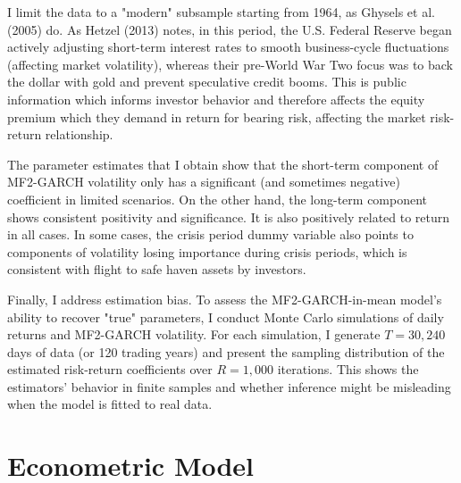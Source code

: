 \documentclass[12pt]{article}
\begin{document}
I limit the data to a "modern" subsample starting from 1964, as Ghysels et al. (2005) do. As Hetzel (2013) notes, in this period, the U.S. Federal Reserve began actively adjusting short-term interest rates to smooth business-cycle fluctuations (affecting market volatility), whereas their pre-World War Two focus was to back the dollar with gold and prevent speculative credit booms. This is public information which informs investor behavior and therefore affects the equity premium which they demand in return for bearing risk, affecting the market risk-return relationship.\par
The parameter estimates that I obtain show that the short-term component of MF2-GARCH volatility only has a significant (and sometimes negative) coefficient in limited scenarios. On the other hand, the long-term component shows consistent positivity and significance. It is also positively related to return in all cases. In some cases, the crisis period dummy variable also points to components of volatility losing importance during crisis periods, which is consistent with flight to safe haven assets by investors.\par
Finally, I address estimation bias. To assess the MF2-GARCH-in-mean model's ability to recover "true" parameters, I conduct Monte Carlo simulations of daily returns and MF2-GARCH volatility. For each simulation, I generate $T=30,240$ days of data (or 120 trading years) and present the sampling distribution of the estimated risk-return coefficients over $R=1,000$ iterations. This shows the estimators' behavior in finite samples and whether inference might be misleading when the model is fitted to real data.\par


\section{Econometric Model}
\end{document}
